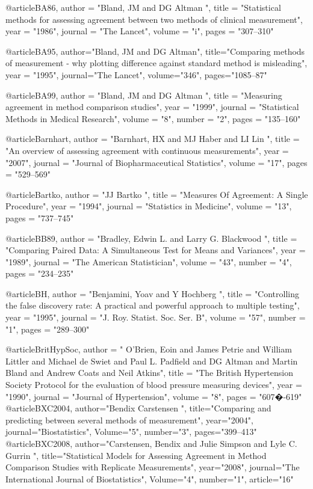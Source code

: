@article{BA86,
	author = "Bland, JM and DG Altman ",
	title = "Statistical methods for assessing agreement between two methods of clinical measurement",
	year = "1986",
	journal = "The Lancet",
	volume = "i",	
	pages = "307--310"
}


@article{BA95,
	author="Bland, JM and DG Altman",
	title="Comparing methods of measurement - why plotting difference against standard method is misleading",
	year = "1995",
	journal="The Lancet",
	volume="346",
	pages="1085--87"
}

@article{BA99,
	author = "Bland, JM and DG Altman ",
	title = "Measuring agreement in method comparison studies",
	year = "1999",
	journal = "Statistical Methods in Medical Research",
	volume = "8",
	number = "2",
	pages = "135--160"
}


@article{Barnhart,
	author = "Barnhart, HX and MJ Haber and LI Lin ",
	title = "An overview of assessing agreement with continuous measurements",
	year = "2007",
	journal = "Journal of Biopharmaceutical Statistics",
	volume = "17",	
	pages = "529--569"
}


@article{Bartko,
	author = "JJ Bartko ",
	title = "Measures Of Agreement: A Single Procedure",
	year = "1994",
	journal = "Statistics in Medicine",
	volume = "13",	
	pages = "737--745"
}


@article{BB89,
	author = "Bradley, Edwin L. and Larry G. Blackwood ",
	title = "Comparing Paired Data: A Simultaneous Test for Means and Variances",
	year = "1989",
	journal = "The American Statistician",
	volume = "43",
	number = "4",
	pages = "234--235"
}


@article{BH,
	author = "Benjamini, Yoav and Y Hochberg  ",
	title = "Controlling the false discovery rate: A
	practical and powerful approach to multiple testing",
	year = "1995",
	journal = "J. Roy. Statist. Soc. Ser. B",
	volume = "57",
	number = "1",
	pages = "289--300"
}

@article{BritHypSoc,
	author = " O'Brien, Eoin and James Petrie and William Littler and Michael de Swiet and Paul L. Padfield and DG Altman and
	Martin Bland and Andrew Coats and Neil Atkins",
	title = "The {B}ritish {H}ypertension {S}ociety Protocol for the evaluation of blood pressure measuring devices",
	year = "1990",
	journal = "Journal of Hypertension",
	volume = "8",
	pages = "607�-619"
}
@article{BXC2004,
	author="Bendix Carstensen ",
	title="Comparing and predicting between several methods of measurement",
	year="2004",
	journal="Biostatistics",
	Volume="5",
	number="3",
	pages="399--413"
}
@article{BXC2008,
	author="Carstensen, Bendix and Julie Simpson and Lyle C. Gurrin ",
	title="Statistical Models for Assessing Agreement in Method Comparison Studies with Replicate Measurements",
	year="2008",
	journal="The International Journal of Biostatistics",
	Volume="4",
	number="1",
	article="16"
}

